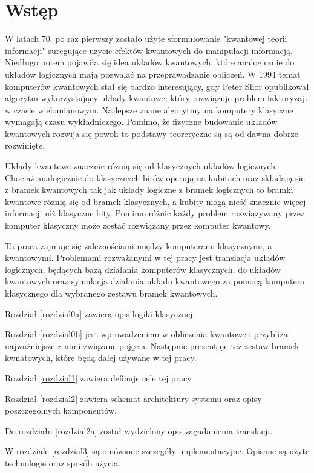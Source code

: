 \chapter{Wstęp}
\thispagestyle{chapterBeginStyle}

W latach 70. po raz pierwszy zostało użyte sformułowanie "kwantowej teorii informacji" suregujące użycie efektów kwantowych do manipulacji informacją. Niedługo potem pojawiła się idea układów kwantowych, które analogicznie do układów logicznych mają pozwalać na przeprawadzanie obliczeń. W 1994 temat komputerów kwantowych stał się bardzo interesujący, gdy Peter Shor opublikował algorytm wykorzystujący układy kwantowe, który rozwiązuje problem faktoryzaji w czasie wielomianowym. Najlepsze znane algorytmy na komputery klasyczne wymagają czasu wykładniczego. Pomimo, że fizyczne budowanie układów kwantowych rozwija się powoli to podstawy teoretyczne są są od dawna dobrze rozwinięte.

Układy kwantowe znacznie różnią się od klasycznych układów logicznych. Chociaż analogicznie do klasycznych bitów operują na kubitach oraz składają się z bramek kwantowych tak jak układy logiczne z bramek logicznych to bramki kwantowe różnią się od bramek klasycznych, a kubity mogą nieść znacznie więcej informacji niż klasyczne bity. Pomimo różnic każdy problem rozwiązywany przez komputer klasyczny może zostać rozwiązany przez komputer kwantowy.

Ta praca zajmuje się zależnościami między komputerami klasycznymi, a kwantowymi. Problemami rozważanymi w tej pracy jest translacja układów logicznych, będących bazą działania komputerów klasycznych, do układów kwantowych oraz symulacja działania układu kwantowego za pomocą komputera klasycznego dla wybranego zestawu bramek kwantowych. 

Rozdział \ref{rozdzial0a} zawiera opis logiki klasycznej.

Rozdział \ref{rozdzial0b} jest wprowadzeniem w obliczenia kwantowe i przybliża najważniejsze z nimi związane pojęcia. Następnie prezentuje też zestaw bramek kwnatowych, które będą dalej używane w tej pracy.

Rozdział \ref{rozdzial1} zawiera definuje cele tej pracy.

Rozdział \ref{rozdzial2} zawiera schemat architektury systemu oraz opisy poszczególnych komponentów.

Do rozdziału \ref{rozdzial2a} został wydzielony opis zagadanienia translacji.

W rozdziale \ref{rozdzial3} są omówione szczegóły implementacyjne. Opisane są użyte technologie oraz sposób użycia.

